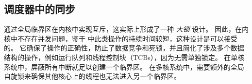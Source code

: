 

\subsection{调度器中的同步\label{sec:design:sync}}

\OSname{} 通过全局临界区在内核中实现互斥，这实际上形成了一种 \textit{大锁} 设计。
因此，在内核中不存在并发问题，鉴于 \OSname{} 中此类操作的持续时间较短，这种设计是可以接受的。
它确保了操作的正确性，防止了数据竞争和死锁，并且简化了涉及多个数据结构的操作，例如运行队列和线程控制块（TCBs），因为无需单独锁定。
在单核系统中，屏蔽所有中断就足以创建一个临界区。
在多核系统中，需要额外的全局自旋锁来确保其他核心上的线程也无法进入另一个临界区。



